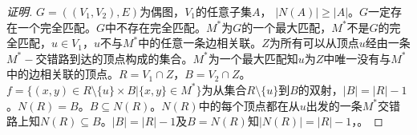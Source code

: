 \documentclass{beamer}
\theoremstyle{definition}
\theoremstyle{example}
\begin{document}
\begin{CJK}{UTF8}{gbsn}

    


\begin{frame}
  \begin{proof}[证明]\justifying\let\raggedright\justifying
    $G=((V_1,V_2),E)$为偶图，$V_1$的任意子集$A$， \pause$|N(A)| \geq |A|$。$G$一定存在一个完全匹配。$G$中不存在完全匹配。$M^*$为$G$的一个最大匹配，$M^*$不是$G$的完全匹配，$u\in V_1$，\pause$u$不与$M^*$中的任意一条边相关联。$Z$为所有可以从顶点$u$经由一条$M^*-$交错路到达的顶点构成的集合。$M^*$为一个最大匹配知$u$为$Z$中唯一没有与$M^*$中的边相关联的顶点。$R=V_1\cap Z$，\pause$B=V_2\cap Z$。$f=\{(x,y)\in R\setminus \{u\}\times B | \{x,y\}\in M^*\}$为从集合$R\setminus \{u\}$到$B$的双射，$|B|=|R|-1$。$N(R)=B$。$B\subseteq N(R)$。$N(R)$中的每个顶点都在从$u$出发的一条$M^*$交错路上知$N(R)\subseteq B$。$|B|=|R|-1$及$B= N(R)$知$|N(R)|=|R|-1$，。
  \end{proof}
\end{frame}



\end{CJK}
\end{document}
